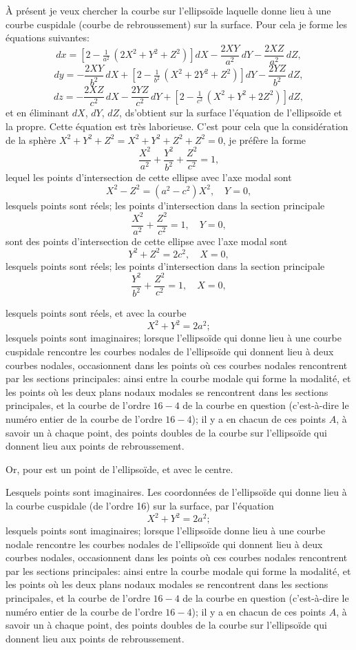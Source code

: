 \documentclass[11pt,a4paper]{book}
\begin{document}
\setcounter{page}{129}

À présent je veux chercher la courbe sur l'ellipsoïde laquelle donne lieu à une courbe cuspidale (courbe de rebroussement) sur la surface. Pour cela je forme les équations suivantes:
\[
dx = \left[2 - \tfrac{1}{a^2}\,(2X^2+Y^2+Z^2)\right]dX - \frac{2XY}{a^2}\,dY - \frac{2XZ}{a^2}\,dZ,
\]
\[
dy = -\frac{2XY}{b^2}\,dX + \left[2 - \tfrac{1}{b^2}\,(X^2+2Y^2+Z^2)\right]dY - \frac{2YZ}{b^2}\,dZ,
\]
\[
dz = -\frac{2XZ}{c^2}\,dX - \frac{2YZ}{c^2}\,dY + \left[2 - \tfrac{1}{c^2}\,(X^2+Y^2+2Z^2)\right]dZ,
\]
et en éliminant $dX$, $dY$, $dZ$, ds'obtient sur la surface l'équation de l'ellipsoïde et la propre. Cette équation est très laborieuse. C'est pour cela que la considération de la sphère $X^2 + Y^2 + Z^2 = X^2 + Y^2 + Z^2 + Z^2 = 0$, je préfère la forme
\[
\frac{X^2}{a^2} + \frac{Y^2}{b^2} + \frac{Z^2}{c^2} = 1,
\]
lequel les points d'intersection de cette ellipse avec l'axe modal sont
\[
X^2 - Z^2 = (a^2 - c^2)X^2,\quad Y = 0,
\]
lesquels points sont réels; les points d'intersection dans la section principale
\[
\frac{X^2}{a^2} + \frac{Z^2}{c^2} = 1,\quad Y = 0,
\]
sont des points d'intersection de cette ellipse avec l'axe modal sont
\[
Y^2 + Z^2 = 2c^2,\quad X = 0,
\]
lesquels points sont réels; les points d'intersection dans la section principale
\[
\frac{Y^2}{b^2} + \frac{Z^2}{c^2} = 1,\quad X = 0,
\]

\setcounter{page}{130}

lesquels points sont réels, et avec la courbe
\[
X^2 + Y^2 = 2a^2;
\]
lesquels points sont imaginaires; lorsque l'ellipsoïde qui donne lieu à une courbe cuspidale rencontre les courbes nodales de l'ellipsoïde qui donnent lieu à deux courbes nodales, occasionnent dans les points où ces courbes nodales rencontrent par les sections principales: ainsi entre la courbe modale qui forme la modalité, et les points où les deux plans nodaux modales se rencontrent dans les sections principales, et la courbe de l'ordre $16 - 4$ de la courbe en question (c'est-à-dire le numéro entier de la courbe de l'ordre $16 - 4$); il y a en chacun de ces points $A$, à savoir un à chaque point, des points doubles de la courbe sur l'ellipsoïde qui donnent lieu aux points de rebroussement.

Or, pour est un point de l'ellipsoïde, et avec le centre.

Lesquels points sont imaginaires. Les coordonnées de l'ellipsoïde qui donne lieu à la courbe cuspidale (de l'ordre 16) sur la surface, par l'équation
\[
X^2 + Y^2 = 2a^2;
\]
lesquels points sont imaginaires; lorsque l'ellipsoïde donne lieu à une courbe nodale rencontre les courbes nodales de l'ellipsoïde qui donnent lieu à deux courbes nodales, occasionnent dans les points où ces courbes nodales rencontrent par les sections principales: ainsi entre la courbe modale qui forme la modalité, et les points où les deux plans nodaux modales se rencontrent dans les sections principales, et la courbe de l'ordre $16 - 4$ de la courbe en question (c'est-à-dire le numéro entier de la courbe de l'ordre $16 - 4$); il y a en chacun de ces points $A$, à savoir un à chaque point, des points doubles de la courbe sur l'ellipsoïde qui donnent lieu aux points de rebroussement.
\end{document}
